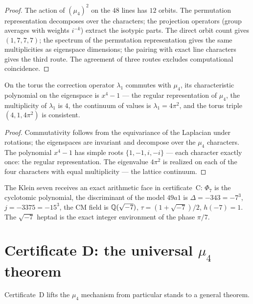 \begin{proof}
The action of $(\mu_4)^2$ on the $48$ lines has $12$ orbits. The
permutation representation decomposes over the characters; the
projection operators (group averages with weights $i^{-k}$) extract
the isotypic parts. The direct orbit count gives $(1,7,7,7)$; the
spectrum of the permutation representation gives the same
multiplicities as eigenspace dimensions; the pairing with exact line
characters gives the third route. The agreement of three routes
excludes computational coincidence.
\end{proof}

\begin{theorem}\label{th:C2}
On the torus the correction operator $\lambda_1$ commutes with
$\mu_4$, its characteristic polynomial on the eigenspace is $x^4-1$
--- the regular representation of $\mu_4$, the multiplicity of
$\lambda_1$ is $4$, the continuum of values is $\lambda_1=4\pi^2$,
and the torus triple $(4,1,4\pi^2)$ is consistent.
\end{theorem}

\begin{proof}
Commutativity follows from the equivariance of the Laplacian under
rotations; the eigenspaces are invariant and decompose over the
$\mu_4$ characters. The polynomial $x^4-1$ has simple roots
$\{1,-1,i,-i\}$ --- each character exactly once: the regular
representation. The eigenvalue $4\pi^2$ is realized on each of the
four characters with equal multiplicity --- the lattice continuum.
\end{proof}

The Klein seven receives an exact arithmetic face in certificate~C:
$\Phi_7$ is the cyclotomic polynomial, the discriminant of the model
$49a1$ is $\Delta=-343=-7^3$, $j=-3375=-15^3$, the CM field is
$\mathbb{Q}(\sqrt{-7})$, $\tau=(1+\sqrt{-7})/2$, $h(-7)=1$. The
$\sqrt{-7}$ heptad is the exact integer environment of the phase
$\pi/7$.

\section{Certificate D: the universal $\mu_4$ theorem}\label{sec:certD}

Certificate~D lifts the $\mu_4$ mechanism from particular stands to a
general theorem.

